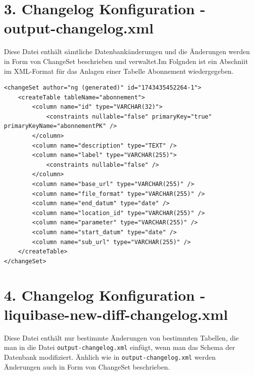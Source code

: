 \documentclass[a4paper,12pt]{scrreprt}
\begin{document}
\section*{\small \textbf{3. Changelog Konfiguration - output-changelog.xml}}
Diese Datei enthält sämtliche Datenbankänderungen und die Änderungen werden in Form von ChangeSet beschrieben und verwaltet.Im Folgnden ist ein Abschniit im XML-Format für das Anlagen einer Tabelle Abonnement wiedergegeben. \\ 
\begin{lstlisting}
<changeSet author="ng (generated)" id="1743435452264-1">
    <createTable tableName="abonnement">
        <column name="id" type="VARCHAR(32)">
            <constraints nullable="false" primaryKey="true" primaryKeyName="abonnementPK" />
        </column>
        <column name="description" type="TEXT" />
        <column name="label" type="VARCHAR(255)">
            <constraints nullable="false" />
        </column>
        <column name="base_url" type="VARCHAR(255)" />
        <column name="file_format" type="VARCHAR(255)" />
        <column name="end_datum" type="date" />
        <column name="location_id" type="VARCHAR(255)" />
        <column name="parameter" type="VARCHAR(255)" />
        <column name="start_datum" type="date" />
        <column name="sub_url" type="VARCHAR(255)" />
    </createTable>
</changeSet>
\end{lstlisting}
\section*{\small \textbf{4. Changelog Konfiguration - liquibase-new-diff-changelog.xml}}
Diese Datei enthält nur bestimmte Änderungen von bestimmten Tabellen, die man in die Datei \texttt{output-changelog.xml} einfügt, wenn man das Schema der Datenbank modifiziert. Änhlich wie in \texttt{output-changelog.xml} werden Änderungen auch in Form von ChangeSet beschrieben.
\end{document}
